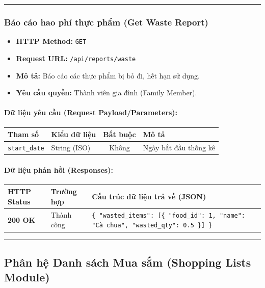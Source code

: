 \documentclass[12pt,a4paper]{article}
\begin{document}
\vskip 0.4cm
\noindent\rule{\textwidth}{0.3pt}
\vskip 0.4cm

\subsubsection{Báo cáo hao phí thực phẩm (Get Waste Report)}
\begin{itemize}[leftmargin=*]
    \item \textbf{HTTP Method:} \texttt{GET}
    \item \textbf{Request URL:} \texttt{/api/reports/waste}
    \item \textbf{Mô tả:} Báo cáo các thực phẩm bị bỏ đi, hết hạn sử dụng.
    \item \textbf{Yêu cầu quyền:} Thành viên gia đình (Family Member).
\end{itemize}

\paragraph{Dữ liệu yêu cầu (Request Payload/Parameters):}
\begin{longtable}{|p{2.8cm}|p{2.2cm}|c|p{7.0cm}|}
\hline
\textbf{Tham số} & \textbf{Kiểu dữ liệu} & \textbf{Bắt buộc} & \textbf{Mô tả} \\ \hline
\endhead
\texttt{start\_date} & String (ISO) & Không & Ngày bắt đầu thống kê \\ \hline
\end{longtable}

\paragraph{Dữ liệu phản hồi (Responses):}
\begin{longtable}{|p{2.8cm}|p{3.2cm}|p{8.0cm}|}
\hline
\textbf{HTTP Status} & \textbf{Trường hợp} & \textbf{Cấu trúc dữ liệu trả về (JSON)} \\ \hline
\endhead
\textbf{200 OK} & Thành công & \texttt{\{ "wasted\_items": [\{ "food\_id": 1, "name": "Cà chua", "wasted\_qty": 0.5 \}] \}} \\ \hline
\end{longtable}

\vskip 0.4cm
\noindent\rule{\textwidth}{0.3pt}
\vskip 0.4cm

\subsection{Phân hệ Danh sách Mua sắm (Shopping Lists Module)}
\end{document}
